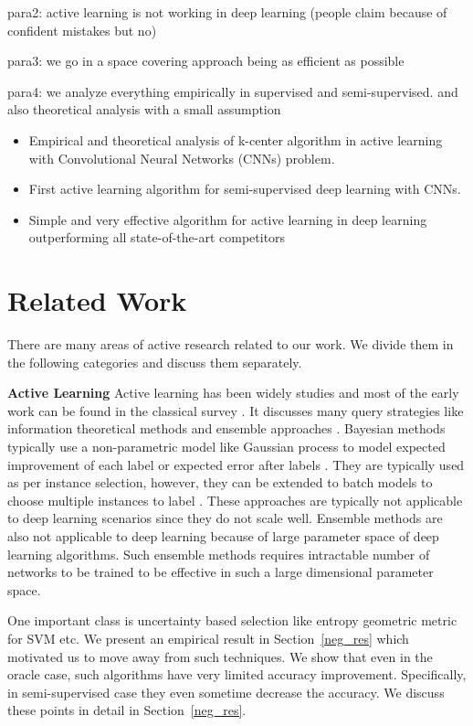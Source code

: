 \documentclass{article}
\begin{document}
para2: active learning is not working in deep learning (people claim because of confident mistakes but no)

para3: we go in a space covering approach being as efficient as possible

para4: we analyze everything empirically in supervised and semi-supervised. and also theoretical analysis with a small assumption

\begin{itemize}
\item Empirical and theoretical analysis of k-center algorithm in active learning with Convolutional Neural Networks (CNNs) problem.
\item First active learning algorithm for semi-supervised deep learning with CNNs.
\item Simple and very effective algorithm for active learning in deep learning outperforming all state-of-the-art competitors
\end{itemize}

\clearpage
\section{Related Work}
There are many areas of active research related to our work. We divide them in the following categories and discuss them separately. 

\noindent\textbf{Active Learning}
Active learning has been widely studies and most of the early work can be found in the classical survey \cite{settles2010active}. It discusses many query strategies like information theoretical methods \cite{mackay1992information} and ensemble approaches \cite{mccallumzy1998employing, freund1997selective}. Bayesian methods typically use a non-parametric model like Gaussian process to model expected improvement of each label \cite{kapoor2007active} or expected error after labels \cite{roy2001toward}. They are typically used as per instance selection, however, they can be extended to batch models to choose multiple instances to label \cite{wang2016parallel}. These approaches are typically not applicable to deep learning scenarios since they do not scale well. Ensemble methods are also not applicable to deep learning because of large parameter space of deep learning algorithms. Such ensemble methods requires intractable number of networks to be trained to be effective in such a large dimensional parameter space.

One important class is uncertainty based selection \cite{tong2001support,lewissequential,joshi2009multi,li2013adaptive} like entropy \cite{joshi2009multi} geometric metric for SVM \cite{tong2001support,brinker2003incorporating} etc. We present an empirical result in Section~\ref{neg_res} which motivated us to move away from such techniques. We show that even in the oracle case, such algorithms have very limited accuracy improvement. Specifically, in semi-supervised case they even sometime decrease the accuracy. We discuss these points in detail in Section~\ref{neg_res}.
\end{document}
